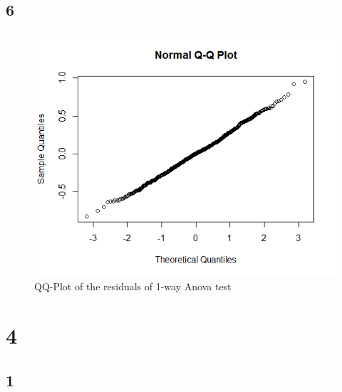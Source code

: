 \documentclass{article}
\begin{document}
    \subsection*{6}
    
    \begin{figure}[!htb]
    \centering
      \includegraphics[scale=0.4]{../results/3_6.png}
      \caption{QQ-Plot of the residuals of 1-way Anova test}
      \label{fig:qq-resid}
    \end{figure}
    
    \section{4}
    \subsection*{1}
    
\end{document}
